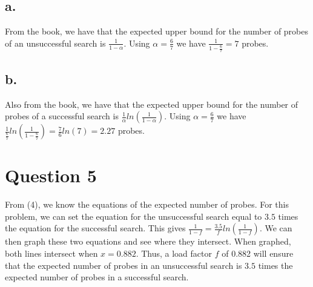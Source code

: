 \documentclass[12pt]{article}
\begin{document}
\subsection{a.}

From the book, we have that the expected upper bound for the number of probes of an unsuccessful search is $\frac{1}{1-\alpha}$. Using $\alpha = \frac{6}{7}$ we have $\frac{1}{1- \frac{6}{7}} = 7$ probes. 

\subsection{b.}

Also from the book, we have that the expected upper bound for the number of probes of a successful search is $\frac{1}{\alpha}ln(\frac{1}{1-\alpha})$. Using $\alpha = \frac{6}{7}$ we have 
$\frac{1}{ \frac{6}{7}}ln(\frac{1}{1- \frac{6}{7}}) = \frac{7}{6}ln(7) = 2.27$ probes.

\section{Question 5}

From (4), we know the equations of the expected number of probes. For this problem, we can set the equation for the unsuccessful search equal to $3.5$ times the equation for the successful search.
This gives $\frac{1}{1-f} = \frac{3.5}{f}ln(\frac{1}{1-f})$. We can then graph these two equations and see where they intersect. When graphed, both lines intersect when $x = 0.882$. Thus, a load factor $f$ of 0.882 will ensure that the expected number of probes in an unsuccessful search is $3.5$ times the expected number of probes in a successful search. 
\end{document}
